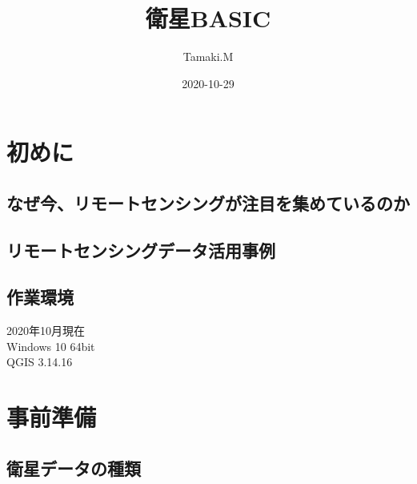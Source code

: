 \documentclass[
]{book}
\title{衛星BASIC}
\author{Tamaki.M}
\date{2020-10-29}
\begin{document}
\maketitle

{
\setcounter{tocdepth}{1}
\tableofcontents
}
\hypertarget{ux521dux3081ux306b}{%
\chapter*{初めに}\label{ux521dux3081ux306b}}

\hypertarget{ux306aux305cux4ecaux30eaux30e2ux30fcux30c8ux30bbux30f3ux30b7ux30f3ux30b0ux304cux6ce8ux76eeux3092ux96c6ux3081ux3066ux3044ux308bux306eux304b}{%
\section{なぜ今、リモートセンシングが注目を集めているのか}\label{ux306aux305cux4ecaux30eaux30e2ux30fcux30c8ux30bbux30f3ux30b7ux30f3ux30b0ux304cux6ce8ux76eeux3092ux96c6ux3081ux3066ux3044ux308bux306eux304b}}

\hypertarget{ux30eaux30e2ux30fcux30c8ux30bbux30f3ux30b7ux30f3ux30b0ux30c7ux30fcux30bfux6d3bux7528ux4e8bux4f8b}{%
\section{リモートセンシングデータ活用事例}\label{ux30eaux30e2ux30fcux30c8ux30bbux30f3ux30b7ux30f3ux30b0ux30c7ux30fcux30bfux6d3bux7528ux4e8bux4f8b}}

\hypertarget{ux4f5cux696dux74b0ux5883}{%
\section{作業環境}\label{ux4f5cux696dux74b0ux5883}}

2020年10月現在\\
Windows 10 64bit\\
QGIS 3.14.16

\hypertarget{ux4e8bux524dux6e96ux5099}{%
\chapter{事前準備}\label{ux4e8bux524dux6e96ux5099}}

\hypertarget{ux885bux661fux30c7ux30fcux30bfux306eux7a2eux985e}{%
\section{衛星データの種類}\label{ux885bux661fux30c7ux30fcux30bfux306eux7a2eux985e}}
\end{document}
